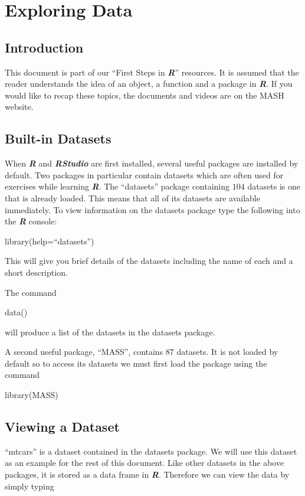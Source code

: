 \documentclass[
]{book}
\begin{document}
\chapter{Exploring Data}\label{exploring-data}

\section{Introduction}\label{introduction-8}

This document is part of our ``First Steps in \textbf{\emph{R}}'' resources. It is assumed that the reader understands the idea of an object, a function and a package in \textbf{\emph{R}}. If you would like to recap these topics, the documents and videos are on the MASH website.

\section{Built-in Datasets}\label{built-in-datasets}

When \textbf{\emph{R}} and \textbf{\emph{RStudio}} are first installed, several useful packages are installed by default. Two packages in particular contain datasets which are often used for exercises while learning \textbf{\emph{R}}. The ``datasets'' package containing \(104\) datasets is one that is already loaded. This means that all of its datasets are available immediately. To view information on the datasets package type the following into the \textbf{\emph{R}} console:

library(help=``datasets'')

This will give you brief details of the datasets including the name of each and a short description.

The command

data()

will produce a list of the datasets in the datasets package.

A second useful package, ``MASS'', contains \(87\) datasets. It is not loaded by default so to access its datasets we must first load the package using the command

library(MASS)

\section{Viewing a Dataset}\label{viewing-a-dataset}

``mtcars'' is a dataset contained in the datasets package. We will use this dataset as an example for the rest of this document. Like other datasets in the above packages, it is stored as a data frame in \textbf{\emph{R}}. Therefore we can view the data by simply typing
\end{document}
